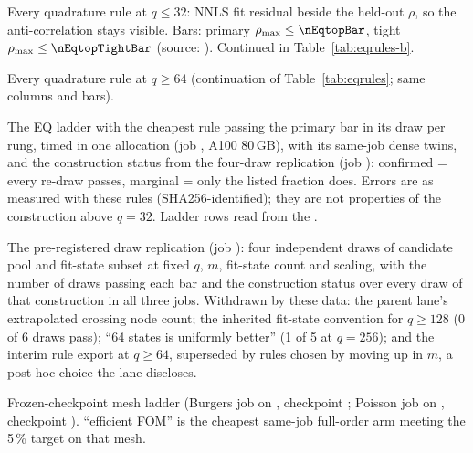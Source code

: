 \begin{table}[h]
\centering
\caption{Every quadrature rule at $q\le32$: NNLS fit residual beside the
held-out $\rho$, so the anti-correlation stays visible. Bars: primary
$\rho_{\max}\le\nEqtopBar$, tight $\rho_{\max}\le\nEqtopTightBar$
(source: \provEqtopBarSource). Continued in Table~\ref{tab:eqrules-b}.}
\label{tab:eqrules}

\end{table}

\begin{table}[h]
\centering
\caption{Every quadrature rule at $q\ge64$ (continuation of
Table~\ref{tab:eqrules}; same columns and bars).}
\label{tab:eqrules-b}

\end{table}

\begin{table}[h]
\centering
\caption{The EQ ladder with the cheapest rule passing the primary bar in its
draw per rung, timed in one allocation (job \provEqtopLadderJob, A100 80\,GB),
with its same-job dense twins, and the construction status from the four-draw
replication (job \provEqtopRepJob): confirmed = every re-draw passes, marginal
= only the listed fraction does. Errors are as measured with these rules
(SHA256-identified); they are not properties of the construction above
$q=32$. Ladder rows read from the \provEqtopLadderSource.}
\label{tab:eqladder}
\resizebox{\linewidth}{!}{}
\end{table}

\begin{table}[h]
\centering
\caption{The pre-registered draw replication (job \provEqtopRepJob): four
independent draws of candidate pool and fit-state subset at fixed $q$, $m$,
fit-state count and scaling, with the number of draws passing each bar and
the construction status over every draw of that construction in all three
jobs. Withdrawn by these data: the parent lane's extrapolated crossing node
count; the inherited fit-state convention for $q\ge128$ (0 of 6 draws pass);
``64 states is uniformly better'' (1 of 5 at $q=256$); and the interim rule
export at $q\ge64$, superseded by rules chosen by moving up in $m$, a
post-hoc choice the lane discloses.}
\label{tab:replication}
\resizebox{\linewidth}{!}{}
\end{table}

\begin{table}[h]
\centering
\caption{Frozen-checkpoint mesh ladder (Burgers job \provMeshBurgersJob on
\provMeshBurgersGpu, checkpoint \provMeshBurgersCkpt; Poisson job
\provMeshPoissonJob on \provMeshPoissonGpu, checkpoint
\provMeshPoissonCkpt). ``efficient FOM'' is the cheapest same-job full-order
arm meeting the 5\,\% target on that mesh.}
\label{tab:mesh}
\resizebox{\linewidth}{!}{}
\end{table}

